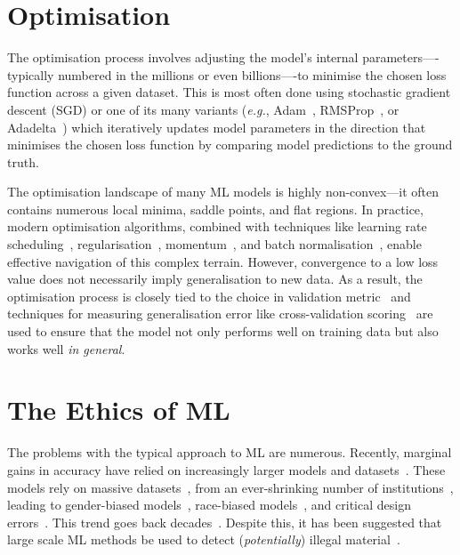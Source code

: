 \section{Optimisation}
The optimisation process involves adjusting the model’s internal parameters—-typically numbered in the millions or even billions—-to minimise the chosen loss function across a given dataset. 
This is most often done using stochastic gradient descent (SGD) or one of its many variants (\textit{e.g.}, Adam~\cite{adam}, RMSProp~\cite{rmsprop}, or Adadelta~\cite{adadelta}) which iteratively updates model parameters in the direction that minimises the chosen loss function by comparing model predictions to the ground truth.

The optimisation landscape of many ML models is highly non-convex---it often contains numerous local minima, saddle points, and flat regions. 
In practice, modern optimisation algorithms, combined with techniques like learning rate scheduling~\cite{learning_rate_scheduling}, regularisation~\cite{xu2009robustness,jakubovitz2018improving,ross2018improving}, momentum~\cite{momentum}, and batch normalisation~\cite{batch_normalisation}, enable effective navigation of this complex terrain. 
However, convergence to a low loss value does not necessarily imply generalisation to new data.
As a result, the optimisation process is closely tied to  the choice in validation metric~\cite{carlini2019evaluating} and techniques for measuring generalisation error like cross-validation scoring~\cite{shalev2014understanding} are used to ensure that the model not only performs well on training data but also works well \textit{in general}.

\section{The Ethics of ML}
\label{sec:ethics}
The problems with the typical approach to ML are numerous. 
Recently, marginal gains in accuracy have relied on increasingly larger models and datasets~\cite{desislavov2021compute}. 
These models rely on massive datasets~\cite{desislavov2021compute,vapnik1994measuring,blumer1989learnability}, from an ever-shrinking number of institutions~\cite{koch2021reduced}, leading to gender-biased models~\cite{lu2020gender}, race-biased models~\cite{buolamwini2018gender}, and critical design errors~\cite{banks2018driver}. 
This trend goes back decades~\cite{corsaro1982something,ramirez2000resource,buolamwini2018gender}. 
Despite this, it has been suggested that large scale ML methods be used to detect (\textit{potentially}) illegal material~\cite{abelson2021bugs}.

